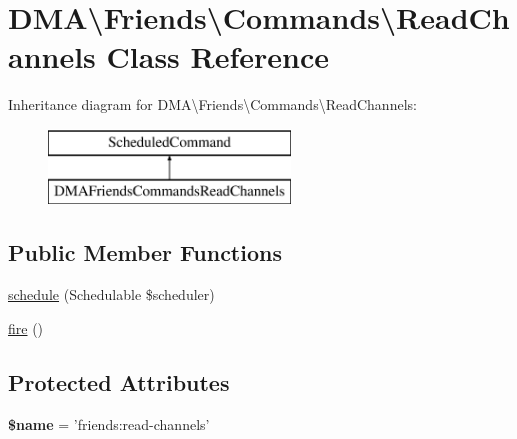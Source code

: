 \hypertarget{classDMA_1_1Friends_1_1Commands_1_1ReadChannels}{\section{D\+M\+A\textbackslash{}Friends\textbackslash{}Commands\textbackslash{}Read\+Channels Class Reference}
\label{classDMA_1_1Friends_1_1Commands_1_1ReadChannels}
}
Inheritance diagram for D\+M\+A\textbackslash{}Friends\textbackslash{}Commands\textbackslash{}Read\+Channels\+:\begin{figure}[H]
\begin{center}
\leavevmode
\includegraphics[height=2.000000cm]{d6/d3d/classDMA_1_1Friends_1_1Commands_1_1ReadChannels}
\end{center}
\end{figure}
\subsection*{Public Member Functions}
\begin{DoxyCompactItemize}
\item 
\hyperlink{classDMA_1_1Friends_1_1Commands_1_1ReadChannels_ad59b45e072cbdfee43b099f9606acba6}{schedule} (Schedulable \$scheduler)
\item 
\hyperlink{classDMA_1_1Friends_1_1Commands_1_1ReadChannels_a58b88a3a6874a74c05e11c028462e8a5}{fire} ()
\end{DoxyCompactItemize}
\subsection*{Protected Attributes}
\begin{DoxyCompactItemize}
\item 
\hypertarget{classDMA_1_1Friends_1_1Commands_1_1ReadChannels_a2d450c7a91b98117ea2a083ca28ea761}{{\bfseries \$name} = 'friends\+:read-\/channels'}\label{classDMA_1_1Friends_1_1Commands_1_1ReadChannels_a2d450c7a91b98117ea2a083ca28ea761}

\end{DoxyCompactItemize}


